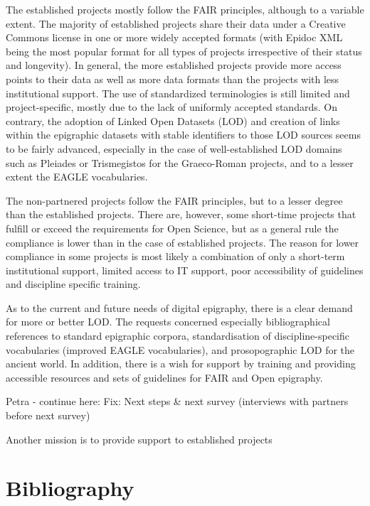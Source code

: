 \documentclass[
  12pt,
]{scrreprt}
\begin{document}
The established projects mostly follow the FAIR principles, although to
a variable extent. The majority of established projects share their data
under a Creative Commons license in one or more widely accepted formats
(with Epidoc XML being the most popular format for all types of projects
irrespective of their status and longevity). In general, the more
established projects provide more access points to their data as well as
more data formats than the projects with less institutional support. The
use of standardized terminologies is still limited and project-specific,
mostly due to the lack of uniformly accepted standards. On contrary, the
adoption of Linked Open Datasets (LOD) and creation of links within the
epigraphic datasets with stable identifiers to those LOD sources seems
to be fairly advanced, especially in the case of well-established LOD
domains such as Pleiades or Trismegistos for the Graeco-Roman projects,
and to a lesser extent the EAGLE vocabularies.

The non-partnered projects follow the FAIR principles, but to a lesser
degree than the established projects. There are, however, some
short-time projects that fulfill or exceed the requirements for Open
Science, but as a general rule the compliance is lower than in the case
of established projects. The reason for lower compliance in some
projects is most likely a combination of only a short-term institutional
support, limited access to IT support, poor accessibility of guidelines
and discipline specific training.

As to the current and future needs of digital epigraphy, there is a
clear demand for more or better LOD. The requests concerned especially
bibliographical references to standard epigraphic corpora,
standardisation of discipline-specific vocabularies (improved EAGLE
vocabularies), and prosopographic LOD for the ancient world. In
addition, there is a wish for support by training and providing
accessible resources and sets of guidelines for FAIR and Open epigraphy.

Petra - continue here: Fix: Next steps \& next survey (interviews with
partners before next survey)

Another mission is to provide support to established projects

\hypertarget{bibliography}{%
\chapter{Bibliography}\label{bibliography}}
\end{document}
